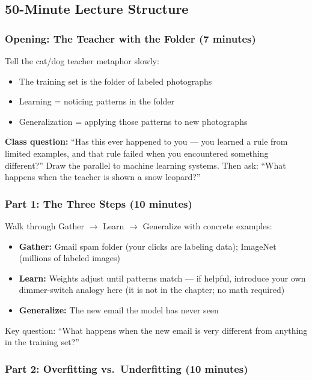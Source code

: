 \subsection{50-Minute Lecture Structure}

\subsubsection{Opening: The Teacher with the Folder (7 minutes)}

Tell the cat/dog teacher metaphor slowly:
\begin{itemize}
    \item The training set is the folder of labeled photographs
    \item Learning = noticing patterns in the folder
    \item Generalization = applying those patterns to new photographs
\end{itemize}

\begin{trythis}
\textbf{Class question:} ``Has this ever happened to you --- you learned a rule from limited examples, and that rule failed when you encountered something different?'' Draw the parallel to machine learning systems. Then ask: ``What happens when the teacher is shown a snow leopard?''
\end{trythis}

\subsubsection{Part 1: The Three Steps (10 minutes)}

Walk through Gather $\to$ Learn $\to$ Generalize with concrete examples:
\begin{itemize}
    \item \textbf{Gather:} Gmail spam folder (your clicks are labeling data); ImageNet (millions of labeled images)
    \item \textbf{Learn:} Weights adjust until patterns match --- if helpful, introduce your own dimmer-switch analogy here (it is not in the chapter; no math required)
    \item \textbf{Generalize:} The new email the model has never seen
\end{itemize}

Key question: ``What happens when the new email is very different from anything in the training set?''

\subsubsection{Part 2: Overfitting vs.\ Underfitting (10 minutes)}

